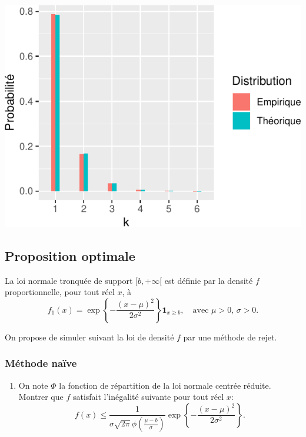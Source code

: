 \documentclass[]{article}
\providecommand{\tightlist}{%
  \setlength{\itemsep}{0pt}\setlength{\parskip}{0pt}}
\begin{document}
\begin{center}\includegraphics{correction_simulation_variables_aleatoires_files/figure-latex/nombre_essai-1} \end{center}

\hypertarget{proposition-optimale}{%
\subsection{Proposition optimale}\label{proposition-optimale}}

La loi normale tronquée de support \([b, +\infty[\) est définie par la
densité \(f\) proportionnelle, pour tout réel \(x\), à
\[f_1(x) = \exp\left\lbrace -\frac{(x-\mu)^2}{2\sigma^2}\right\rbrace\mathbf{1}_{x\geq b},
\quad\text{avec $\mu > 0$, $\sigma > 0$}.\]

On propose de simuler suivant la loi de densité \(f\) par une méthode de
rejet.

\hypertarget{muxe9thode-nauxefve}{%
\subsubsection{Méthode naïve}\label{muxe9thode-nauxefve}}

\begin{enumerate}
\def\labelenumi{\arabic{enumi}.}
\tightlist
\item
  On note \(\Phi\) la fonction de répartition de la loi normale centrée
  réduite. Montrer que \(f\) satisfait l'inégalité suivante pour tout
  réel \(x\):
  \[f(x)\leq \frac{1}{\sigma\sqrt{2\pi}\phi(\frac{\mu-b}{\sigma})}\exp\left\lbrace -\frac{(x-\mu)^2}{2\sigma^2}\right\rbrace.\]
\end{enumerate}
\end{document}
